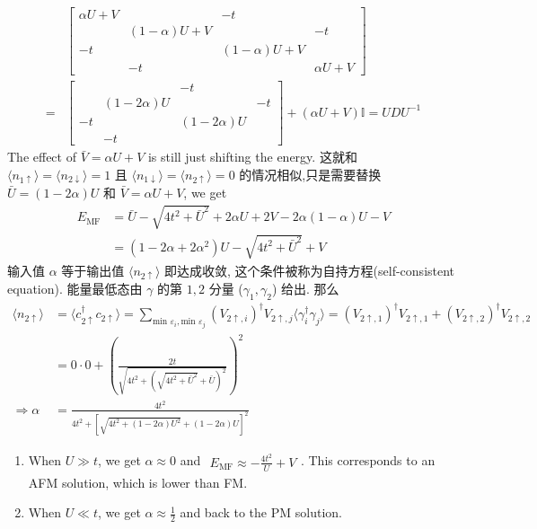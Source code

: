 \documentclass[../../main.tex]{subfiles}
\begin{document}
\begin{enumerate}
{{  \begin{align*}
    &\begin{bmatrix}
      \alpha U + V &    & -t &   \\
        & (1 - \alpha)U + V &  & -t\\
     -t &    & (1 - \alpha)U + V &   \\
        & -t &    & \alpha U + V
   \end{bmatrix} \\
   = &\begin{bmatrix}
              &                 & -t              &   \\
              & (1 - 2\alpha)U  &                 & -t\\
   -t         &                 & (1 - 2\alpha)U  &   \\
              & -t              &                 &  
 \end{bmatrix} + (\alpha U + V)\mathbb{I} = UDU^{-1}
  \end{align*}
  The effect of $\bar{V} = \alpha U + V$ is still just shifting the energy. 这就和 $\langle n_{1\uparrow}\rangle = \langle n_{2\downarrow}\rangle =1$ 且 $\langle n_{1\downarrow}\rangle = \langle n_{2\uparrow}\rangle = 0$ 的情况相似,只是需要替换 $\bar{U} = (1 - 2\alpha)U$ 和 $\bar{V} = \alpha U + V$, we get
  \begin{align*}
    E_{\text{MF}} &= \bar{U} - \sqrt{4t^{2} + \bar{U}^{2}} + 2\alpha U + 2V - 2\alpha(1-\alpha)U - V\\
    &= (1 - 2\alpha + 2\alpha^{2})U - \sqrt{4t^{2} + \bar{U}^{2}} + V
  \end{align*}
  输入值 $\alpha$ 等于输出值 $\langle n_{2\uparrow}\rangle$ 即达成收敛, 这个条件被称为自持方程(self-consistent equation). 能量最低态由 $\gamma$ 的第 $1,2$ 分量 ($\gamma_{1},\gamma_{2}$) 给出. 那么
  \begin{align*}
    \langle n_{2\uparrow}\rangle &= \langle c_{2\uparrow}^{\dagger}c_{2\uparrow}\rangle = \sum_{\text{min }\varepsilon_{i},\text{min }\varepsilon_{j}}(V_{2\uparrow,i})^{\dagger}V_{2\uparrow, j}\langle\gamma^{\dagger}_{i}\gamma_{j}\rangle = (V_{2\uparrow,1})^{\dagger}V_{2\uparrow,1} + (V_{2\uparrow,2})^{\dagger}V_{2\uparrow,2}\\
    &= 0 \cdot 0 + \left(\frac{2t}{\sqrt{4t^{2} + (\sqrt{4t^{2} + \bar{U}^{2}} + \bar{U})^{2}}}\right)^{2}\\
    \Rightarrow \alpha &= \frac{4t^{2}}{4t^{2} + [\sqrt{4t^{2} + (1 - 2\alpha)U^{2}} + (1 - 2\alpha)U]^{2}}
  \end{align*}
  \begin{enumerate}
    \item When $U\gg t$, we get $\alpha\approx 0$ and $\begin{aligned}
      E_{\text{MF}}\approx -\frac{4t^{2}}{U} + V
    \end{aligned}$. This corresponds to an AFM solution, which is lower than FM. 
    \item When $U\ll t$, we get $\alpha\approx \frac{1}{2}$ and back to the PM solution.
  \end{enumerate}}}
  

\end{enumerate}
\end{document}
